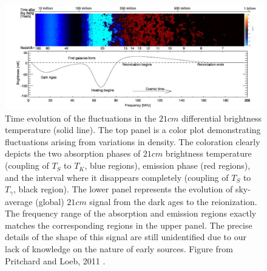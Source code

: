 \documentclass[%
 reprint,
 amsmath,amssymb,
 aps,
]{revtex4-2}
\begin{document}
\begin{figure}[h!]

\centering
\includegraphics[scale =0.45]{global_signal_pritchard_loeb.jpg}
\caption[Time evolution of the fluctuations in the $21cm$ differential brightness temperature]{Time evolution of the fluctuations in the $21cm$ differential brightness temperature (solid line). The top panel is a color plot demonstrating fluctuations arising from variations in density. The coloration clearly depicts the two absorption phases of $21cm$ brightness temperature (coupling of $T_S$ to $T_K$, blue regions), emission phase (red regions), and the interval where it disappears completely (coupling of $T_S$ to $T_\gamma$, black region). The lower panel represents the evolution of sky-average (global) $21cm$ signal from the dark ages to the reionization. The frequency range of the absorption and emission regions exactly matches the corresponding regions in the upper panel. The precise details of the shape of this signal are still unidentified due to our lack of knowledge on the nature of early sources\cite{liu2013global}. Figure from Pritchard and Loeb, 2011 \cite{21century}.}
\label{fig:global_signal_pritchard_loeb}
\end{figure}
\end{document}
